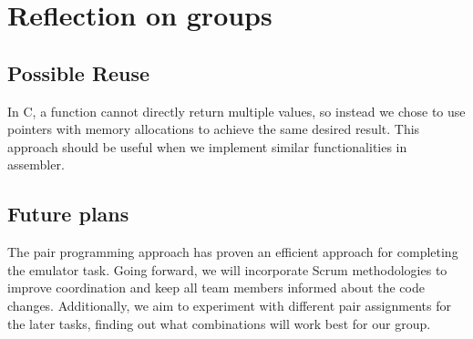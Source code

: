 \documentclass[10pt]{article}
\begin{document}
\section{Reflection on groups}
\subsection{Possible Reuse}
In C, a function cannot directly return multiple values, so instead we chose to use pointers with memory allocations to achieve the same desired result. This approach should be useful when we implement similar functionalities in assembler.

\subsection{Future plans}

The pair programming approach has proven an efficient approach for completing the emulator task. Going forward, we will incorporate Scrum methodologies to improve coordination and keep all team members informed about the code changes. Additionally, we aim to experiment with different pair assignments for the later tasks, finding out what combinations will work best for our group.
\end{document}

